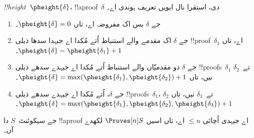 \documentclass[../../../include/open-logic-section]{subfiles}
\begin{document}
\begin{defn}
\emph{!!{height}}~$\pheight{\delta}$، !!a{proof}~$\delta$ دی، استقرا نال ایویں تعریف ہوندی اے۔
\begin{enumerate}
\item جے $\delta$ بس اک مفروضہ اے، تاں $\pheight{\delta} = 0$۔
\item جے $\delta$ اک مقدمے والے استنباط اُتے مُکدا اے جیہدا سدھا ذیلی !!{proof}~$\delta_1$ اے، تاں $\pheight{\delta} = \pheight{\delta_1} + 1$۔
\item جے $\delta$ دو مقدمیّاں والے استنباط اُتے مُکدا اے جیہدے سدھے ذیلی !!{proof}s~$\delta_1$ تے~$\delta_2$ نیں، تاں $\pheight{\delta} =
  \max(\pheight{\delta_1}, \pheight{\delta_2}) + 1$۔
\item جے $\delta$، \Elim{\lor} اُتے مُکدا اے جیہدے سدھے ذیلی !!{proof}s~$\delta_1$، $\delta_2$ تے~$\delta_3$ نیں، تاں $\pheight{\delta} =
  \max(\pheight{\delta_1}, \pheight{\delta_2}, \pheight{\delta_3}) + 1$۔
\end{enumerate}
جے سیکوئنٹ~$S$ دا !!a{proof} اے جیہدی اُچائی $\le n$ اے، تاں اسیں $\Proves[n] S$ لکھدے آں۔
\end{defn}
\end{document}
